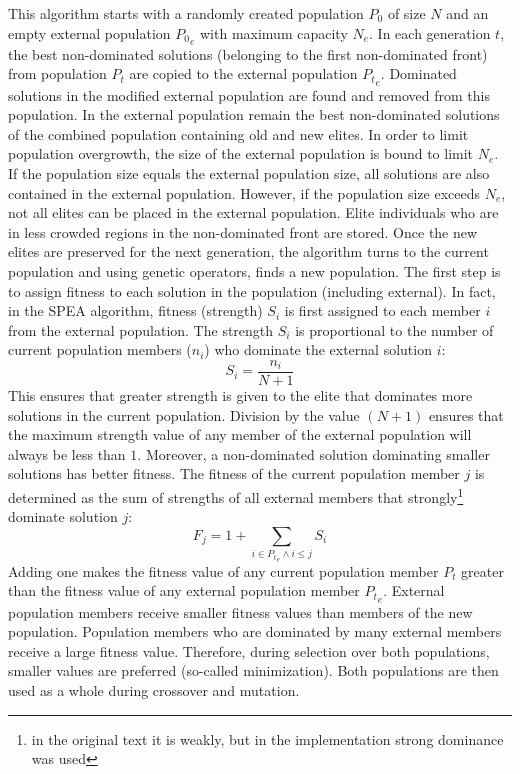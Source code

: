 This algorithm starts with a randomly created population $P_0$ of size $N$ and
an empty external population ${P_0}_e$ with maximum capacity $N_e$. In each generation $t$,
the best non-dominated solutions (belonging to the first non-dominated front) from population
$P_t$ are copied to the external population ${P_t}_e$. Dominated solutions in the modified external
population are found and removed from this population.
In the external population remain the best non-dominated solutions of the combined
population containing old and new elites. In order to limit population overgrowth,
the size of the external population is bound to limit $N_e$. If the population size
equals the external population size, all solutions are also contained in the external
population. However, if the population size exceeds $N_e$, not all elites
can be placed in the external population.
Elite individuals who are in less crowded regions in the non-dominated front
are stored. Once the new elites are preserved for the next generation, the algorithm
turns to the current population and using genetic operators, finds a new
population.
The first step is to assign fitness to each solution in the population (including external).
In fact, in the SPEA algorithm, fitness (strength) $S_i$ is first assigned to
each member $i$ from the external population. The strength $S_i$ is proportional to the number of current
population members ($n_i$) who dominate the external solution $i$:
\begin{equation}
  S_i = \frac{n_i}{N+1}
\end{equation}
This ensures that greater strength is given to the elite that dominates more solutions in the current
population. Division by the value $(N + 1)$ ensures that the maximum strength value
of any member of the external population will always be less than $1$. Moreover, a non-dominated
solution dominating smaller solutions has better fitness. The fitness
of the current population member $j$ is determined as the sum of strengths of all external members that
strongly\footnote{in the original text \cite{evo} it is weakly, but in the implementation strong dominance was used}
dominate solution $j$:
\begin{equation}
  F_j = 1 + \sum\limits_{i \in {P_t}_e \wedge i \leq j} S_i
\end{equation}
Adding one makes the fitness value of any current population member $P_t$
greater than the fitness value of any external population member ${P_t}_e$.
External population members receive smaller fitness values than members of the new
population. Population
members who are dominated by many external members receive a large
fitness value. Therefore, during selection over both populations, smaller
values are preferred (so-called minimization). Both populations are then used as a whole during crossover
and mutation.

